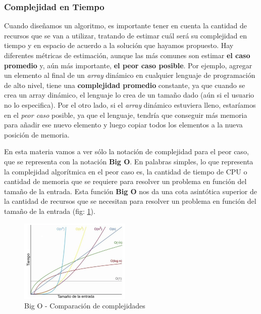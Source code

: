 \subsubsection{Complejidad en Tiempo}

Cuando diseñamos un algoritmo, es importante tener en cuenta la cantidad de recursos que se van a utilizar, tratando de
estimar cuál será su complejidad en tiempo y en espacio de acuerdo a la solución que hayamos propuesto. Hay diferentes
métricas de estimación, aunque las más comunes son estimar \textbf{el caso promedio} y, aún más importante, \textbf{el
peor caso posible}. Por ejemplo, agregar un elemento al final de un \textit{array} dinámico en cualquier lenguaje de
programación de alto nivel, tiene una \textbf{complejidad promedio} constante, ya que cuando se crea un array dinámico,
el lenguaje lo crea de un tamaño dado (aún si el usuario no lo especifica). Por el otro lado, si el \textit{array}
dinámico estuviera lleno, estaríamos en el \textit{peor caso} posible, ya que el lenguaje, tendría que conseguir más
memoria para añadir ese nuevo elemento y luego copiar todos los elementos a la nueva posición de memoria.

En esta materia vamos a ver sólo la notación de complejidad para el peor caso, que se representa con la notación
\textbf{Big O}. En palabras simples, lo que representa la complejidad algorítmica en el peor caso es, la cantidad de
tiempo de CPU o cantidad de memoria que se requiere para resolver un problema en función del tamaño de la entrada. Esta
función \textbf{Big O} nos da una cota asintótica superior de la cantidad de recursos que se necesitan para resolver un
problema en función del tamaño de la entrada (fig: \ref{fig:big_o_comparison}).

\begin{figure}[H]
  \centering
  \includegraphics[width=200px]{./images/big_o_comparison.png}
  \caption{Big O - Comparación de complejidades}
  \label{fig:big_o_comparison}
\end{figure}

